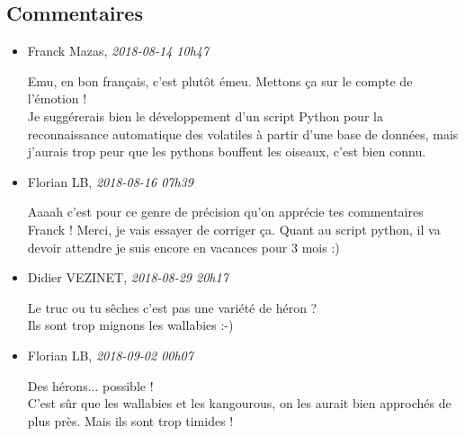 \documentclass[]{article}
\date{}
\begin{document}
\hypertarget{commentaires}{%
\subsection{Commentaires}\label{commentaires}}

\begin{itemize}
\item
  Franck Mazas, \emph{2018-08-14 10h47}

  Emu, en bon français, c'est plutôt émeu. Mettons ça sur le compte de
  l'émotion !\\
  Je suggérerais bien le développement d'un script Python pour la
  reconnaissance automatique des volatiles à partir d'une base de
  données, mais j'aurais trop peur que les pythons bouffent les oiseaux,
  c'est bien connu.
\item
  Florian LB, \emph{2018-08-16 07h39}

  Aaaah c'est pour ce genre de précision qu'on apprécie tes commentaires
  Franck ! Merci, je vais essayer de corriger ça. Quant au script
  python, il va devoir attendre je suis encore en vacances pour 3 mois
  :)
\item
  Didier VEZINET, \emph{2018-08-29 20h17}

  Le truc ou tu sêches c'est pas une variété de héron ?\\
  Ils sont trop mignons les wallabies :-)
\item
  Florian LB, \emph{2018-09-02 00h07}

  Des hérons... possible !\\
  C'est sûr que les wallabies et les kangourous, on les aurait bien
  approchés de plus près. Mais ils sont trop timides !
\end{itemize}
\end{document}

